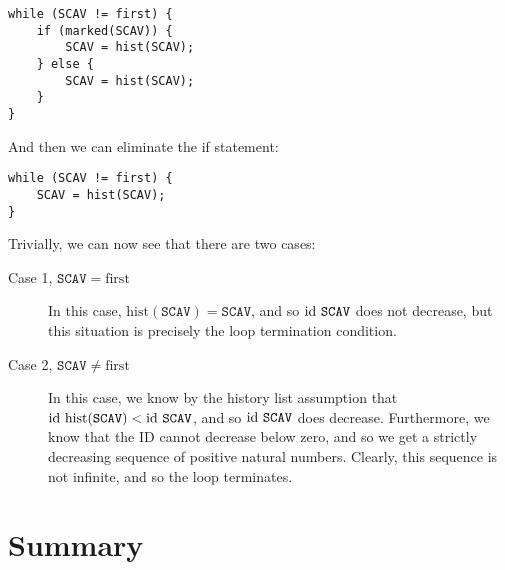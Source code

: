 \begin{lstlisting}
while (SCAV != first) {
    if (marked(SCAV)) {
        SCAV = hist(SCAV);
    } else {
        SCAV = hist(SCAV);
    }
}
\end{lstlisting}

And then we can eliminate the if statement:

\begin{lstlisting}
while (SCAV != first) {
    SCAV = hist(SCAV);
}
\end{lstlisting}

Trivially, we can now see that there are two cases:

\begin{description}
  \item[Case 1, $\mathtt{SCAV} = \mathrm{first}$] In this case,
    $\mathrm{hist}(\mathtt{SCAV}) = \mathtt{SCAV}$, and so
    $\mathrm{id}~\mathtt{SCAV}$ does not decrease, but this situation is
    precisely the loop termination condition.

  \item[Case 2, $\mathtt{SCAV} \neq \mathrm{first}$] In this case, we
    know by the history list assumption that
    $\mathrm{id}~\mathrm{hist}(\mathtt{SCAV}) < \mathrm{id}~\mathtt{SCAV}$, and so
    $\mathrm{id}~\mathtt{SCAV}$ does decrease. Furthermore, we know that the
    ID cannot decrease below zero, and so we get a strictly decreasing
    sequence of positive natural numbers. Clearly, this sequence is
    not infinite, and so the loop terminates.
\end{description}

\section{Summary}

